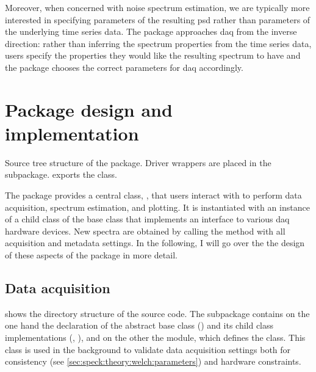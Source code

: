 Moreover, when concerned with noise spectrum estimation, we are typically more interested in specifying parameters of the resulting \gls{psd} rather than parameters of the underlying time series data.
The \pyspeck package approaches \acrlong{daq} from the inverse direction: rather than inferring the spectrum properties from the time series data, users specify the properties they would like the resulting spectrum to have and the package chooses the correct parameters for \acrlong{daq} accordingly.

\section{Package design and implementation}\label{sec:speck:software:design}
\begin{marginfigure}[*-11]
    
    \caption[]{
        Source tree structure of the \pyspeck package.
        Driver wrappers are placed in the  subpackage.
         exports the  class.
    }
    \label{fig:speck:software:tree}
\end{marginfigure}
The \pyspeck package provides a central class, , that users interact with to perform data acquisition, spectrum estimation, and plotting.
It is instantiated with an instance of a child class of the  base class that implements an interface to various \gls{daq} hardware devices.
New spectra are obtained by calling the  method with all acquisition and metadata settings.
In the following, I will go over the the design of these aspects of the package in more detail.

\subsection{Data acquisition}\label{subsec:speck:software:design:daq}
 shows the directory structure of the source code.
The  subpackage contains on the one hand the declaration of the  abstract base class () and its child class implementations (, \etc), and on the other the  module, which defines the  class.
This class is used in the background to validate data acquisition settings both for consistency (see \cref{sec:speck:theory:welch:parameters}) and hardware constraints.

